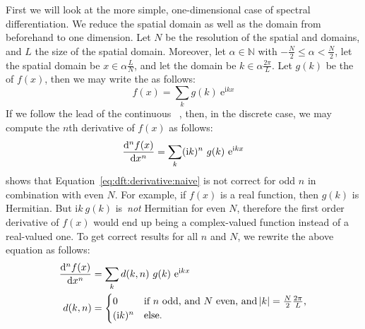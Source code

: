 First we will look at the more simple, one-dimensional case of spectral
differentiation. We reduce the spatial domain as well as the \wavevector domain
from beforehand to one dimension. Let $N$ be the resolution of the spatial
and \wavenumber domains, and $L$ the size of the spatial domain. Moreover, let
$\alpha \in \mathbb{N}$ with $-\frac{N}{2} \leq \alpha < \frac{N}{2}$,
let the spatial domain be $x \in \alpha \frac{L}{N}$, and let the \wavenumber
domain be $k \in \alpha \frac{2\pi}{L}$. Let $g(k)$ be the \DiscreteFourierTransform
of $f(x)$, then we may write the \InvDiscreteFourierTransform as follows:
\begin{equation*}
 f(x) = \sum_{k}g(k)~\mathrm{e}^{\mathrm{i}kx}
\end{equation*}
If we follow the
lead of the continuous \FourierTransform~\citep{Trefethen:2000},
then, in the discrete case, we may compute the $n$th derivative of $f(x)$ as follows:
\begin{equation}
\label{eq:dft:derivative:naive}
  \dod[n]{f(x)}{x} = \sum_{k}(\mathrm{i}k)^n~g(k)~\mathrm{e}^{\mathrm{i}kx}
\end{equation}
\citet{Johnson:2011} shows that Equation~\ref{eq:dft:derivative:naive} is not correct for odd $n$ in
combination with even $N$. For example, if $f(x)$ is a real function, then $g(k)$ is Hermitian.
But $\mathrm{i}k~g(k)$ is~\emph{not} Hermitian for even $N$, therefore the first
order derivative of $f(x)$ would end up being a complex-valued function instead of a real-valued one.
To get correct results for all $n$ and $N$, we rewrite the above equation as follows:
\begin{align}
\label{eq:dft_derivative}
  \dod[n]{f(x)}{x} &= \sum_{k}d(k, n)~g(k)~\mathrm{e}^{\mathrm{i}kx} \\
\label{eq:dft_derivative_correction}
  d(k, n) &= \begin{cases}
                   0 &\text{if $n$ odd, and $N$ even, and $\abs{k}
= \frac{N}{2}\frac{2\pi}{L}$,} \\
                   (\mathrm{i}k)^n &\text{else.}
                   \end{cases}
\end{align}
%
